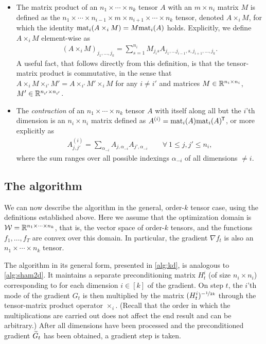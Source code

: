 \begin{itemize}
\item
The matrix product of an $n_1 \times \cdots \times n_k$ tensor $A$ with an $m \times n_i$ matrix $M$ is defined as the $n_1 \times \cdots \times n_{i-1} \times m \times n_{i+1} \times
\cdots \times n_k$ tensor, denoted $A\times_i M$, for which the identity
$\mathrm{mat}_{i}(A\times_i M) = M \mathrm{mat}_{i}(A)$ holds.
Explicitly, we define $A\times_i M$ element-wise as
\begin{align*}
(A \times_i M)_{j_1,\ldots,j_k}
=
\sum_{s=1}^{n_i} M_{j_i s} A_{j_1, \ldots j_{i-1}, s, j_{i+1}, \ldots, j_k}.
\end{align*}
A useful fact, that follows directly from this definition, is that the tensor-matrix product is commutative, in the sense that $A \times_i M \times_{i'} M' = A \times_{i'} M' \times_{i} M$ for any $i \neq i'$ and matrices $M \in \mathbb{R}^{n_i \times n_i}$, $M' \in \mathbb{R}^{n_{i'} \times n_{i'}}$.

\item
The \emph{contraction} of an $n_1 \times \cdots \times n_k$ tensor $A$ with itself along all but the $i$'th dimension is an $n_i
\times n_i$ matrix defined as $A^{(i)} = \mathrm{mat}_{i}(A) \mathrm{mat}_{i}(A)^{\mkern-1.5mu\scriptstyle\mathsf{T}}$, or
more explicitly as
\begin{align*}
A^{(i)}_{j,j'}
=
\sum_{\alpha_{-i}} A_{j,\alpha_{-i}} A_{j',\alpha_{-i}}
\qquad
\forall ~ 1 \le j,j' \le n_i
,
\end{align*}
where the sum ranges over all possible indexings $\alpha_{-i}$ of all dimensions $\ne i$.
\end{itemize}


\subsection{The algorithm}

We can now describe the \NAME algorithm in the general, order-$k$ tensor
case, using the definitions established above.  Here we assume that the
optimization domain is $\mathcal{W} = \mathbb{R}^{n_1 \times \cdots \times n_k}$, that
is, the vector space of order-$k$ tensors, and the functions
$f_1,\ldots,f_T$ are convex over this domain.  In particular, the gradient
$\nabla f_t$ is also an $n_1 \times \cdots \times n_k$ tensor.

The \NAME algorithm in its general form, presented in \cref{alg:kd}, is
analogous to \cref{alg:sham2d}. It maintains a separate preconditioning
matrix $H_t^i$ (of size $n_i \times n_i$) corresponding to for each
dimension $i \in [k]$ of the gradient.  On step $t$, the $i$'th mode of
the gradient $G_t$ is then multiplied by the matrix
$(H^{i}_t)^{-\nicefrac{1}{2k}}$ through the tensor-matrix product operator
$\times_i$.  (Recall that the order in which the multiplications are carried
out does not affect the end result and can be arbitrary.) After all
dimensions have been processed and the preconditioned gradient $\smash{\widetilde{G}}_t$
has been obtained, a gradient step is taken.

